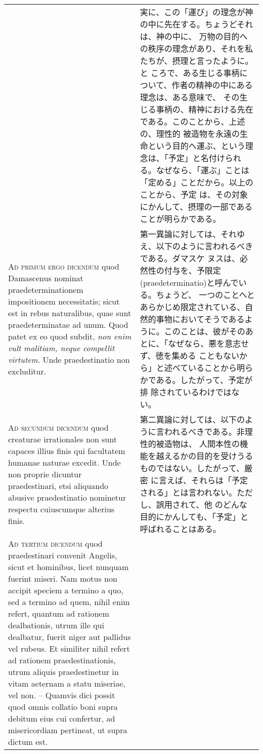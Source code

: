 \documentclass[10pt]{jsarticle} %
\begin{document}
\begin{longtable}{p{21em}p{21em}}
 
&

実に、この「運び」の理念が神の中に先在する。ちょうどそれは、神の中に、
万物の目的への秩序の理念があり、それを私たちが、摂理と言ったように。と
ころで、ある生じる事柄について、作者の精神の中にある理念は、ある意味で、
その生じる事柄の、精神における先在である。このことから、上述の、理性的
被造物を永遠の生命という目的へ運ぶ、という理念は、「予定」と名付けられ
る。なぜなら、「運ぶ」ことは「定める」ことだから。以上のことから、予定
は、その対象にかんして、摂理の一部であることが明らかである。


\\


{\scshape Ad primum ergo dicendum} quod Damascenus
nominat praedeterminationem impositionem necessitatis; sicut est in
rebus naturalibus, quae sunt praedeterminatae ad unum. Quod patet ex eo
quod subdit, {\itshape non enim vult malitiam, neque compellit virtutem}. Unde
praedestinatio non excluditur.


 
&


第一異論に対しては、それゆえ、以下のように言われるべきである。ダマスケ
ヌスは、必然性の付与を、予限定(praedeterminatio)と呼んでいる。ちょうど、
一つのことへとあらかじめ限定されている、自然的事物においてそうであるよ
うに。このことは、彼がそのあとに、「なぜなら、悪を意志せず、徳を集める
こともないから」と述べていることから明らかである。したがって、予定が排
除されているわけではない。

\\


{\scshape Ad secundum dicendum} quod creaturae
irrationales non sunt capaces illius finis qui facultatem humanae
naturae excedit. Unde non proprie dicuntur praedestinari, etsi aliquando
abusive praedestinatio nominetur respectu cuiuscumque alterius finis.


 
&

第二異論に対しては、以下のように言われるべきである。非理性的被造物は、
人間本性の機能を越えるかの目的を受けうるものではない。したがって、厳密
に言えば、それらは「予定される」とは言われない。ただし、誤用されて、他
のどんな目的にかんしても、「予定」と呼ばれることはある。


\\


{\scshape Ad tertium dicendum} quod praedestinari
convenit Angelis, sicut et hominibus, licet nunquam fuerint miseri. Nam
motus non accipit speciem a termino a quo, sed a termino ad quem, nihil
enim refert, quantum ad rationem dealbationis, utrum ille qui dealbatur,
fuerit niger aut pallidus vel rubeus. Et similiter nihil refert ad
rationem praedestinationis, utrum aliquis praedestinetur in vitam
aeternam a statu miseriae, vel non. -- Quamvis dici possit quod omnis
collatio boni supra debitum eius cui confertur, ad misericordiam
pertineat, ut supra dictum est.


\end{longtable}
\end{document}
